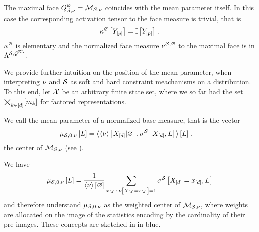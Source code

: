 \begin{example}
    \label{exa:maximalFaceMeasure}
    The maximal face $Q^{\varnothing}_{\mathcal{S},\nu}=\mathcal{M}_{\mathcal{S},\nu}$ coincides with the mean parameter itself.
    In this case the corresponding activation tensor to the face measure is trivial, that is
    \begin{align*}
        \kappa^{\varnothing}\left[Y_{[p]}\right] = \mathbb{I}\left[Y_{[p]}\right] \, .
    \end{align*}
    $\kappa^{\varnothing}$ is elementary and the normalized face measure $\nu^{\mathcal{S},\varnothing}$ to the maximal face is in $\Lambda^{\mathcal{S},\mathcal{G}^{\mathrm{EL}}}$.
\end{example}




We provide further intuition on the position of the mean parameter, when interpreting $\nu$ and $\mathcal{S}$ as soft and hard constraint meachanisms on a distribution.
To this end, let $\mathcal{X}$ be an arbitrary finite state set, where we so far had the set $\bigtimes_{k\in[d]}[m_{k}]$ for factored representations.

\begin{definition}
    We call the mean parameter of a normalized base measure, that is the vector
    \begin{align*}
        \mu_{\mathcal{S},0,\nu}\left[L\right]
        &= \left\langle \left\langle \nu\right\rangle \left[ X_{[d]} | \varnothing \right],\sigma^{\mathcal{S}}\left[X_{[d]},L\right]\right\rangle \left[ L \right] \, .
    \end{align*}
    the center of $\mathcal{M}_{\mathcal{S},\nu}$ (see ).
\end{definition}

We have
\begin{align*}
    \mu_{\mathcal{S},0,\nu}\left[L\right] = \frac{1}{\left\langle \nu\right\rangle \left[ \varnothing \right]} \sum_{x_{[d]}\,:\,\nu\left[X_{[d]}=x_{[d]}\right]=1}  \sigma^{\mathcal{S}}\left[X_{[d]}=x_{[d]},L\right]
\end{align*}
and therefore understand $\mu_{\mathcal{S},0,\nu}$ as the weighted center of $\mathcal{M}_{\mathcal{S},\nu}$, where weights are allocated on the image of the statistics encoding by the cardinality of their pre-images.
These concepts are sketched in  in blue.


